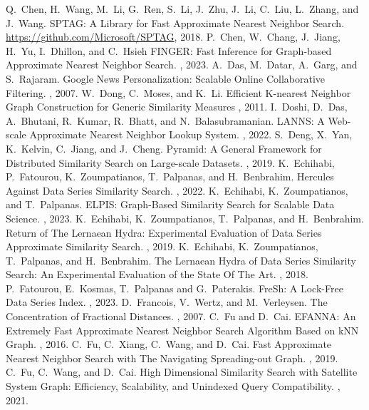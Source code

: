 \documentclass[11pt]{article}
\begin{document}
\begin{thebibliography}{10}
\begin{footnotesize}
Q.~Chen, H.~Wang, M.~Li, G.~Ren, S.~Li, J.~Zhu, J.~Li, C.~Liu, L.~Zhang, and J.~Wang. \newblock  SPTAG: A Library for Fast Approximate Nearest Neighbor Search. \newblock  \url{https://github.com/Microsoft/SPTAG}, 2018.
P.~Chen, W.~Chang, J.~Jiang, H.~Yu, I.~Dhillon, and C.~Hsieh \newblock  FINGER: Fast Inference for Graph-based Approximate Nearest Neighbor Search. , 2023.  
 A.~Das, M.~Datar, A.~Garg, and S.~Rajaram. \newblock  Google News Personalization: Scalable Online Collaborative Filtering. , 2007.
W.~Dong, C.~Moses, and K.~Li. \newblock Efficient K-nearest Neighbor Graph Construction for Generic Similarity Measures , 2011.
I.~Doshi, D.~Das, A.~Bhutani, R.~Kumar, R.~Bhatt, and N.~Balasubramanian. \newblock LANNS: A Web-scale Approximate Nearest Neighbor Lookup System. , 2022.
S.~Deng, X.~Yan, K.~Kelvin, C.~Jiang, and J.~Cheng. \newblock Pyramid: A General Framework for Distributed Similarity Search on Large-scale Datasets. , 2019.
K.~Echihabi, P.~Fatourou, K.~Zoumpatianos, T.~Palpanas, and H.~Benbrahim. \newblock Hercules Against Data Series Similarity Search. , 2022.
K.~Echihabi, K.~Zoumpatianos, and T.~Palpanas. \newblock ELPIS: Graph-Based Similarity Search for Scalable Data Science. , 2023.  
K.~Echihabi, K.~Zoumpatianos, T.~Palpanas, and H.~Benbrahim. \newblock Return of The Lernaean Hydra: Experimental Evaluation of Data Series Approximate Similarity Search. , 2019.
K.~Echihabi, K.~Zoumpatianos, T.~Palpanas, and H.~Benbrahim. \newblock The Lernaean Hydra of Data Series Similarity Search: An Experimental Evaluation of the State Of The Art. , 2018.
P.~Fatourou, E.~Kosmas, T.~Palpanas and G.~Paterakis. \newblock  FreSh: A Lock-Free Data Series Index. , 2023.
D.~Francois, V.~Wertz, and M.~Verleysen. \newblock The Concentration of Fractional Distances. , 2007.  
C.~Fu and D.~Cai. \newblock EFANNA: An Extremely Fast Approximate Nearest Neighbor Search Algorithm Based on kNN Graph. , 2016.
C.~Fu, C.~Xiang, C.~Wang, and D.~Cai. \newblock Fast Approximate Nearest Neighbor Search with The Navigating Spreading-out Graph. , 2019.
C.~Fu, C.~Wang, and D.~Cai. \newblock High Dimensional Similarity Search with Satellite System Graph: Efficiency, Scalability, and Unindexed Query Compatibility. , 2021.

\end{footnotesize}
\end{thebibliography}
\end{document}
